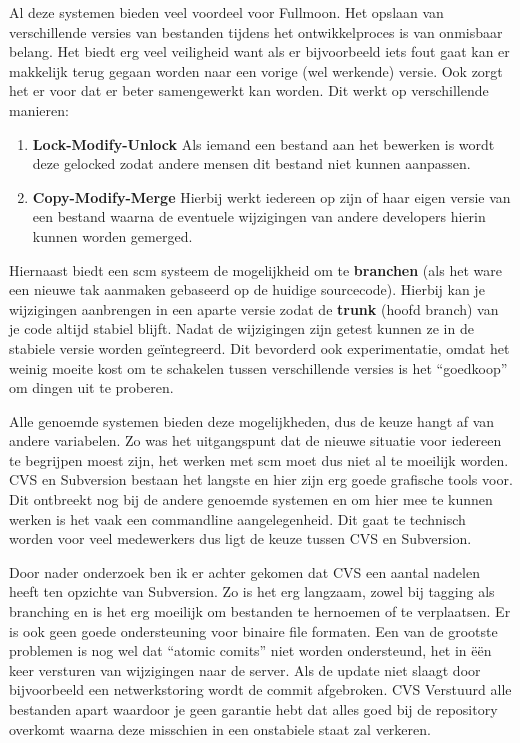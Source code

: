 \documentclass[12pt,a4paper]{article}
\begin{document}
    Al deze systemen bieden veel voordeel voor Fullmoon. Het opslaan van verschillende versies van bestanden tijdens het ontwikkelproces is van onmisbaar belang. Het biedt erg veel veiligheid want als er bijvoorbeeld iets fout gaat kan er makkelijk terug gegaan worden naar een vorige (wel werkende) versie. Ook zorgt het er voor dat er beter samengewerkt kan worden. Dit werkt op verschillende manieren:
    
    \begin{enumerate}
      \item \textbf{Lock-Modify-Unlock} Als iemand een bestand aan het bewerken is wordt deze gelocked zodat andere mensen dit bestand niet kunnen aanpassen.
      \item \textbf{Copy-Modify-Merge} Hierbij werkt iedereen op zijn of haar eigen versie van een bestand waarna de eventuele wijzigingen van andere developers hierin kunnen worden gemerged. 
    \end{enumerate}
    
    Hiernaast biedt een {\sc scm} systeem de mogelijkheid om te \textbf{branchen} (als het ware een nieuwe tak aanmaken gebaseerd op de huidige sourcecode). Hierbij kan je wijzigingen aanbrengen in een aparte versie zodat de \textbf{trunk} (hoofd branch) van je code altijd stabiel blijft. Nadat de wijzigingen zijn getest kunnen ze in de stabiele versie worden ge\"{i}ntegreerd. Dit bevorderd ook experimentatie, omdat het weinig moeite kost om te schakelen tussen verschillende versies is het ``goedkoop'' om dingen uit te proberen.
    
    Alle genoemde systemen bieden deze mogelijkheden, dus de keuze hangt af van andere variabelen. Zo was het uitgangspunt dat de nieuwe situatie voor iedereen te begrijpen moest zijn, het werken met {\sc scm} moet dus niet al te moeilijk worden. CVS en Subversion bestaan het langste en hier zijn erg goede grafische tools voor. Dit ontbreekt nog bij de andere genoemde systemen en om hier mee te kunnen werken is het vaak een commandline aangelegenheid. Dit gaat te technisch worden voor veel medewerkers dus ligt de keuze tussen CVS en Subversion.
    
    Door nader onderzoek ben ik er achter gekomen dat CVS een aantal nadelen heeft ten opzichte van Subversion. Zo is het erg langzaam, zowel bij tagging als branching en is het erg moeilijk om bestanden te hernoemen of te verplaatsen. Er is ook geen goede ondersteuning voor binaire file formaten. Een van de grootste problemen is nog wel dat ``atomic comits'' niet worden ondersteund,  het in \"{e}\"{e}n keer versturen van wijzigingen naar de server. Als de update niet slaagt door bijvoorbeeld een netwerkstoring wordt de commit afgebroken. CVS Verstuurd alle bestanden apart waardoor je geen garantie hebt dat alles goed bij de repository overkomt waarna deze misschien in een onstabiele staat zal verkeren.
    
\end{document}
